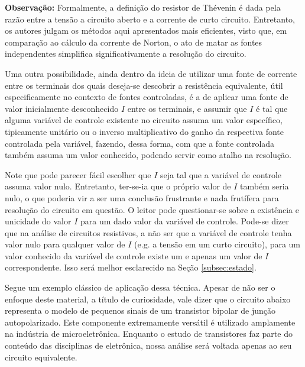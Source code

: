 \documentclass{article}
\numberwithin{equation}{section}
\begin{document}
\textbf{Observação:} Formalmente, a definição do resistor de Thévenin é dada pela razão entre a tensão a circuito aberto e a corrente de curto circuito. Entretanto, os autores julgam os métodos aqui apresentados mais eficientes, visto que, em comparação ao cálculo da corrente de Norton, o ato de matar as fontes independentes simplifica significativamente a resolução do circuito.

\vspace{2mm}

Uma outra possibilidade, ainda dentro da ideia de utilizar uma fonte de corrente entre os terminais dos quais deseja-se descobrir a resistência equivalente, útil especificamente no contexto de fontes controladas, é a de aplicar uma fonte de valor inicialmente desconhecido $I$ entre os terminais, e assumir que $I$ é tal que alguma variável de controle existente no circuito assuma um valor específico, tipicamente unitário ou o inverso multiplicativo do ganho da respectiva fonte controlada pela variável, fazendo, dessa forma, com que a fonte controlada também assuma um valor conhecido, podendo servir como atalho na resolução.

Note que pode parecer fácil escolher que $I$ seja tal que a variável de controle assuma valor nulo. Entretanto, ter-se-ia que o próprio valor de $I$ também seria nulo, o que poderia vir a ser uma conclusão frustrante e nada frutífera para resolução do circuito em questão. O leitor pode questionar-se sobre a existência e unicidade do valor $I$ para um dado valor da variável de controle. Pode-se dizer que na análise de circuitos resistivos, a não ser que a variável de controle tenha valor nulo para qualquer valor de $I$ (e.g. a tensão em um curto circuito), para um valor conhecido da variável de controle existe um e apenas um valor de $I$ correspondente. Isso será melhor esclarecido na Seção \ref{subsec:estado}.

Segue um exemplo clássico de aplicação dessa técnica. Apesar de não ser o enfoque deste material, a título de curiosidade, vale dizer que o circuito abaixo representa o modelo de pequenos sinais de um transistor bipolar de junção autopolarizado. Este componente extremamente versátil é utilizado amplamente na indústria de microeletrônica. Enquanto o estudo de transistores faz parte do conteúdo das disciplinas de eletrônica, nossa análise será voltada apenas ao seu circuito equivalente.
\end{document}
